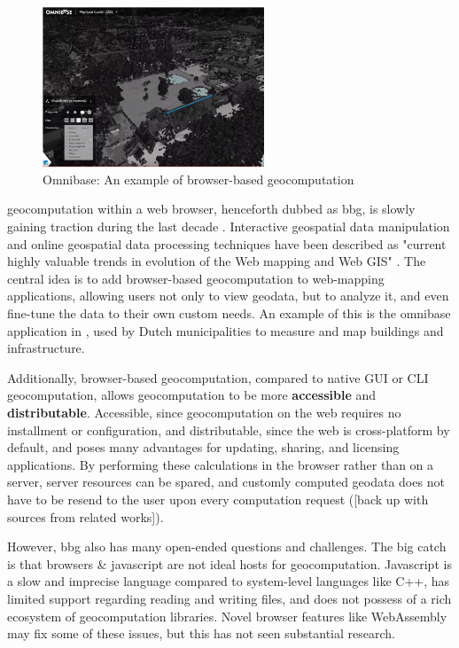 \begin{figure}
  \centering
  \graphicspath{ {../../assets/images/background/geo-web/} }
  \includegraphics[width=250px]{omnibase.png}
  \caption{Omnibase: An example of browser-based geocomputation}
  \label{fig:1:omnibase}
\end{figure}

\ac{geocomputation} within a web browser, henceforth dubbed as \ac{bbg}, is slowly gaining traction during the last decade \cite{kulawiak_analysis_2019, panidi_hybrid_2015, hamilton_client-side_2014}. 
Interactive geospatial data manipulation and online geospatial data processing techniques have been described as "current highly valuable trends in evolution of the Web mapping and Web GIS" \cite{panidi_hybrid_2015}. 
The central idea is to add browser-based geocomputation to web-mapping applications, allowing users not only to view geodata, but to analyze it, and even fine-tune the data to their own custom needs.
An example of this is the omnibase application in , used by Dutch municipalities to measure and map buildings and infrastructure.

Additionally, browser-based geocomputation, compared to native GUI or CLI geocomputation, allows geocomputation to be more \textbf{accessible} and \textbf{distributable}. 
Accessible, since geocomputation on the web requires no installment or configuration, 
and distributable, since the web is cross-platform by default, and poses many advantages for updating, sharing, and licensing applications. 
By performing these calculations in the browser rather than on a server, server resources can be spared, and customly computed geodata does not have to be resend to the user upon every computation request ([back up with sources from related works]).

However, \ac{bbg} also has many open-ended questions and challenges. 
The big catch is that browsers \& javascript are not ideal hosts for geocomputation. 
Javascript is a slow and imprecise language compared to system-level languages like C++, has limited support regarding reading and writing files, and does not possess of a rich ecosystem of geocomputation libraries.  
Novel browser features like WebAssembly may fix some of these issues, but this has not seen substantial research. 

